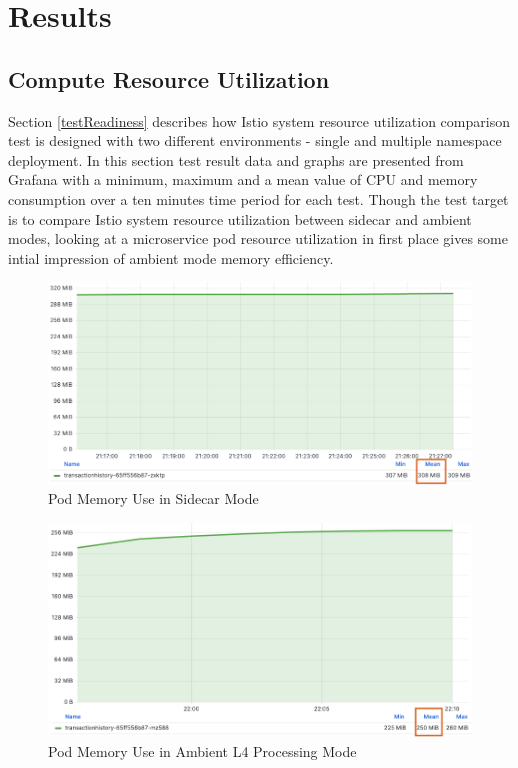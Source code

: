 \section{Results}
\label{resultSection}
\subsection{Compute Resource Utilization}
Section \ref{testReadiness} describes how Istio system resource utilization comparison test is designed with two different environments - single and multiple namespace deployment. In this section test result data and graphs are presented from Grafana with a minimum, maximum and a mean value of CPU and memory consumption over a ten minutes time period for each test. Though the test target is to compare Istio system resource utilization between sidecar and ambient modes, looking at a microservice pod resource utilization in first place gives some intial impression of ambient mode memory efficiency.

\begin{figure}[ht!]
  \centering
  \includegraphics[width=0.73\linewidth]{resources/sidecar-pod-mem.png}
  \caption{Pod Memory Use in Sidecar Mode}
  \label{result:podMemUseSidecar}
\end{figure}

\begin{figure}[ht!]
  \centering
  \includegraphics[width=0.73\linewidth]{resources/ambient-pod-mem.png}
  \caption{Pod Memory Use in Ambient L4 Processing Mode}
  \label{result:podMemUseAmbient}
\end{figure}

